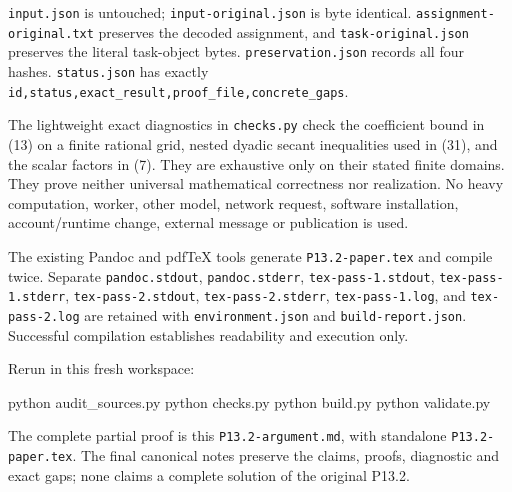 \documentclass[
  10pt,
]{article}
\newenvironment{Shaded}{}{}
\newcommand{\ExtensionTok}[1]{#1}
\newcommand{\NormalTok}[1]{#1}
\begin{document}
\texttt{input.json} is untouched; \texttt{input-original.json} is byte
identical. \texttt{assignment-original.txt} preserves the decoded
assignment, and \texttt{task-original.json} preserves the literal
task-object bytes. \texttt{preservation.json} records all four hashes.
\texttt{status.json} has exactly
\texttt{id,status,exact\_result,proof\_file,concrete\_gaps}.

The lightweight exact diagnostics in \texttt{checks.py} check the
coefficient bound in (13) on a finite rational grid, nested dyadic
secant inequalities used in (31), and the scalar factors in (7). They
are exhaustive only on their stated finite domains. They prove neither
universal mathematical correctness nor realization. No heavy
computation, worker, other model, network request, software
installation, account/runtime change, external message or publication is
used.

The existing Pandoc and pdfTeX tools generate \texttt{P13.2-paper.tex}
and compile twice. Separate \texttt{pandoc.stdout},
\texttt{pandoc.stderr}, \texttt{tex-pass-1.stdout},
\texttt{tex-pass-1.stderr}, \texttt{tex-pass-2.stdout},
\texttt{tex-pass-2.stderr}, \texttt{tex-pass-1.log}, and
\texttt{tex-pass-2.log} are retained with \texttt{environment.json} and
\texttt{build-report.json}. Successful compilation establishes
readability and execution only.

Rerun in this fresh workspace:

\begin{Shaded}
\begin{Highlighting}[]
\ExtensionTok{python}\NormalTok{ audit\_sources.py}
\ExtensionTok{python}\NormalTok{ checks.py}
\ExtensionTok{python}\NormalTok{ build.py}
\ExtensionTok{python}\NormalTok{ validate.py}
\end{Highlighting}
\end{Shaded}

The complete partial proof is this \texttt{P13.2-argument.md}, with
standalone \texttt{P13.2-paper.tex}. The final canonical notes preserve
the claims, proofs, diagnostic and exact gaps; none claims a complete
solution of the original P13.2.
\end{document}
